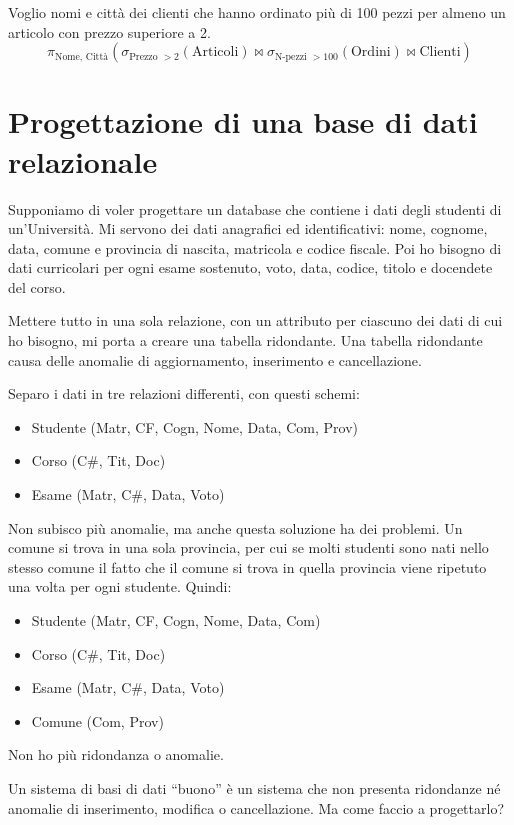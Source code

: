 Voglio nomi e citt\`a dei clienti che hanno ordinato pi\`u di 100 pezzi per almeno un articolo con prezzo superiore a 2.
\[
\pi_{\text{Nome, Citt\`a}} \left( \sigma_{\text{Prezzo } > 2} (\text{Articoli}) \Join \sigma_{\text{N-pezzi } > 100} \left( \text{Ordini} \right) \Join \text{Clienti} \right)
\]

\chapter{Progettazione di una base di dati relazionale}

Supponiamo di voler progettare un database che contiene i dati degli studenti di un'Universit\`a. Mi servono dei dati anagrafici ed identificativi: nome, cognome, data, comune e provincia di nascita, matricola e codice fiscale. Poi ho bisogno di dati curricolari per ogni esame sostenuto, voto, data, codice, titolo e docendete del corso.

Mettere tutto in una sola relazione, con un attributo per ciascuno dei dati di cui ho bisogno, mi porta a creare una tabella ridondante. Una tabella ridondante causa delle anomalie di aggiornamento, inserimento e cancellazione.

Separo i dati in tre relazioni differenti, con questi schemi:
\begin{itemize}
    \item Studente (Matr, CF, Cogn, Nome, Data, Com, Prov)
    \item Corso (C\#, Tit, Doc)
    \item Esame (Matr, C\#, Data, Voto)
\end{itemize}
Non subisco pi\`u anomalie, ma anche questa soluzione ha dei problemi. Un comune si trova in una sola provincia, per cui se molti studenti sono nati nello stesso comune il fatto che il comune si trova in quella provincia viene ripetuto una volta per ogni studente. Quindi:
\begin{itemize}
    \item Studente (Matr, CF, Cogn, Nome, Data, Com)
    \item Corso (C\#, Tit, Doc)
    \item Esame (Matr, C\#, Data, Voto)
    \item Comune (Com, Prov)
\end{itemize}
Non ho pi\`u ridondanza o anomalie.

Un sistema di basi di dati ``buono'' \`e un sistema che non presenta ridondanze n\'e anomalie di inserimento, modifica o cancellazione. Ma come faccio a progettarlo?

